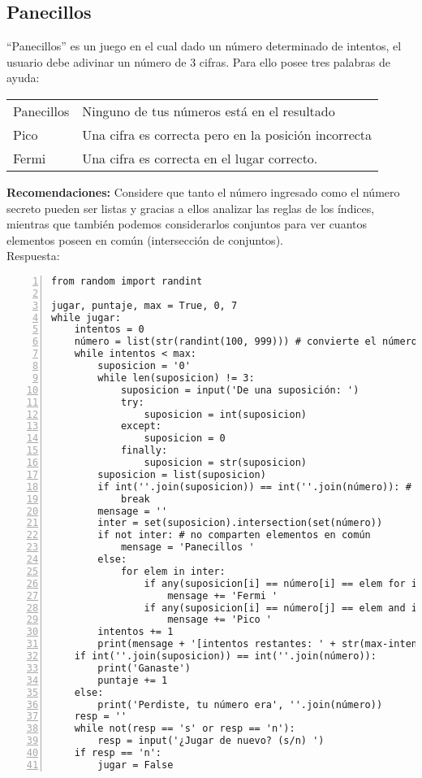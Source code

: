 \documentclass[11pt,twoside]{report}
\begin{document}
\subsection{Panecillos}
``Panecillos'' es un juego en el cual dado un número determinado de intentos, el usuario debe adivinar un número de 3 cifras. Para ello posee tres palabras de ayuda:
\begin{center}
\begin{longtable}{lp{8cm}}
Panecillos & Ninguno de tus números está en el resultado\\
Pico & Una cifra es correcta pero en la posición incorrecta\\
Fermi & Una cifra es correcta en el lugar correcto.
\end{longtable}
\end{center}
\textbf{Recomendaciones:} Considere que tanto el número ingresado como el número secreto pueden ser listas y gracias a ellos analizar las reglas de los índices, mientras que también podemos considerarlos conjuntos para ver cuantos elementos poseen en común (intersección de conjuntos).\\
{\sc Respuesta:}
\begin{lstlisting}[numbers=left]
from random import randint

jugar, puntaje, max = True, 0, 7
while jugar:
    intentos = 0
    número = list(str(randint(100, 999))) # convierte el número en una lista
    while intentos < max:
        suposicion = '0'
        while len(suposicion) != 3:
            suposicion = input('De una suposición: ')
            try:
                suposicion = int(suposicion)
            except:
                suposicion = 0
            finally:
                suposicion = str(suposicion)
        suposicion = list(suposicion)
        if int(''.join(suposicion)) == int(''.join(número)): # ¿son iguales?
            break
        mensage = ''
        inter = set(suposicion).intersection(set(número))
        if not inter: # no comparten elementos en común
            mensage = 'Panecillos '
        else:
            for elem in inter:
                if any(suposicion[i] == número[i] == elem for i in [0, 1, 2]):
                    mensage += 'Fermi '
                if any(suposicion[i] == número[j] == elem and i != j for i in range(3) for j in range(3)):
                    mensage += 'Pico '
        intentos += 1
        print(mensage + '[intentos restantes: ' + str(max-intentos) + ']')
    if int(''.join(suposicion)) == int(''.join(número)):
        print('Ganaste')
        puntaje += 1
    else:
        print('Perdiste, tu número era', ''.join(número))
    resp = ''
    while not(resp == 's' or resp == 'n'):
        resp = input('¿Jugar de nuevo? (s/n) ')
    if resp == 'n':
        jugar = False
\end{lstlisting}
\end{document}
